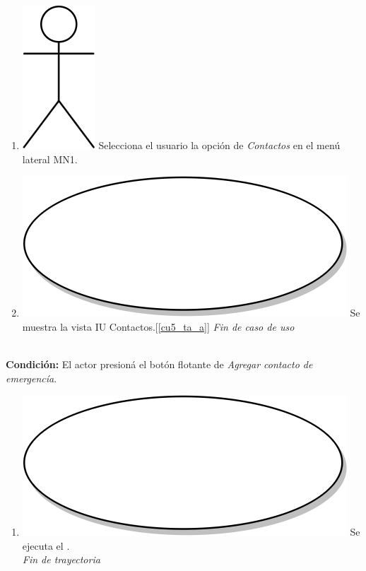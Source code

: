 \begin{enumerate}
\item {\includegraphics[scale=.1]{Capitulo3/img/actor.png} Selecciona el usuario la opción de \textit{Contactos} en el menú lateral MN1.}
\item {\includegraphics[scale=.05]{Capitulo3/img/proceso.png} Se muestra la vista IU Contactos.[\ref{cu5_ta_a}]}
  \textit{Fin de caso de uso} \\  
\end{enumerate}

\textbf{} \\
\textbf{Condición:} El actor presioná el botón flotante de \textit{Agregar contacto de emergencía}. \\
 \begin{enumerate}[label=A\arabic*]
    \item {\includegraphics[scale=.05]{Capitulo3/img/proceso.png} Se ejecuta el \textbf{}.} \\
    \textit{Fin de trayectoria} \\
\end{enumerate}

